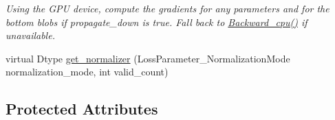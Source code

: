 \begin{DoxyCompactItemize}
\begin{DoxyCompactList}\small\item\em Using the G\+PU device, compute the gradients for any parameters and for the bottom blobs if propagate\+\_\+down is true. Fall back to \hyperlink{classcaffe_1_1SoftmaxWithLossLayer_a1095ffefd8deea5dad9e659a83ce3d5f}{Backward\+\_\+cpu()} if unavailable. \end{DoxyCompactList}\item 
virtual Dtype \hyperlink{classcaffe_1_1SoftmaxWithLossLayer_aef4567bafcd7b1665f2a2cc71ea02ff4}{get\+\_\+normalizer} (Loss\+Parameter\+\_\+\+Normalization\+Mode normalization\+\_\+mode, int valid\+\_\+count)
\end{DoxyCompactItemize}
\subsection*{Protected Attributes}

